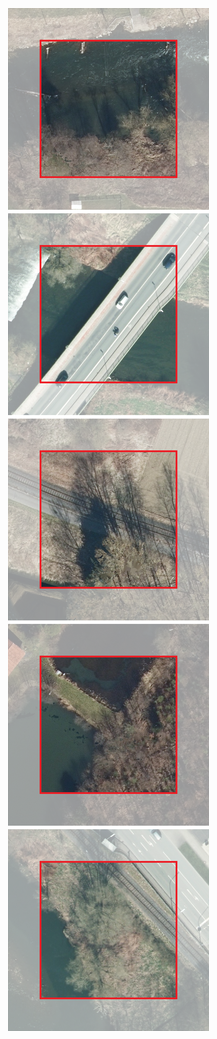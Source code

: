 \begin{figure}[h]
    \newcommand{\UnetPredictionsImageWidth}{0.15\textwidth}
    \centering

    \begin{subfigure}{\UnetPredictionsImageWidth}
        \includegraphics[width=\textwidth]{images/unet/originals}

\end{subfigure}
\end{figure}
